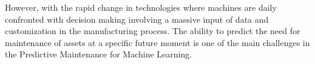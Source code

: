 However, with the rapid change in technologies where machines are daily confronted with decision making involving a massive input of data and customization in the manufacturing process. The ability to predict the need for maintenance of assets at a specific future moment is one of the main challenges in the Predictive Maintenance for Machine Learning.



